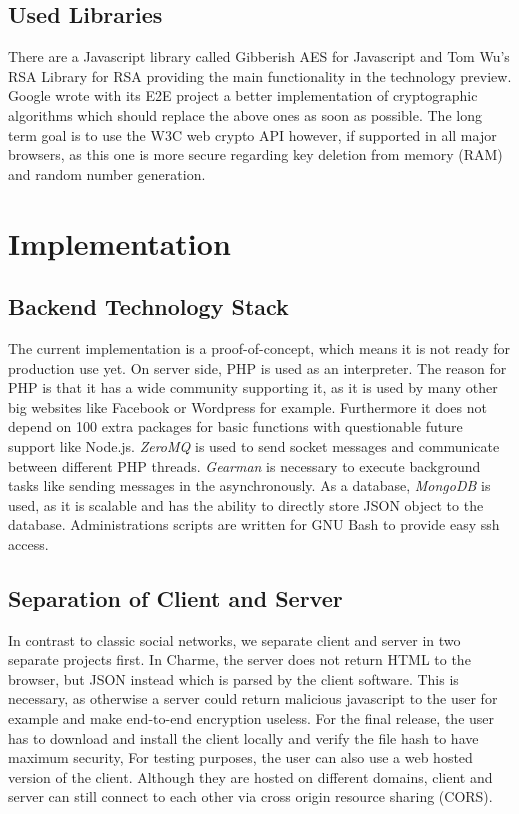 \documentclass{scrartcl}
\begin{document}
\subsection{Used Libraries}
There are a Javascript library called Gibberish AES for Javascript and Tom Wu's RSA Library for RSA providing the main functionality in the technology preview. Google wrote with its E2E project a better implementation of cryptographic algorithms which should replace the above ones as soon as possible. The long term goal is to use the W3C web crypto API however, if supported in all major browsers, as this one is more secure regarding key deletion from memory (RAM) and random number generation. 

\newpage
\section{Implementation}
\subsection{Backend Technology Stack}
The current implementation is a proof-of-concept, which means it is not ready for production use yet.
On server side, PHP is used as an interpreter. The reason for PHP is that it has a wide community supporting it, as it is used by many other big websites like Facebook or Wordpress for example. Furthermore it does not depend on 100 extra packages for basic functions with questionable future support like Node.js.
 \textit{ZeroMQ} is used to send socket messages and communicate between different PHP threads. \textit{Gearman} is necessary to execute background tasks like sending messages in the asynchronously. As a database, \textit{MongoDB} is used, as it is scalable and has the ability to directly store JSON object to the database.
Administrations scripts are written for GNU Bash to provide easy ssh access.



 \subsection{Separation of Client and Server}
In contrast to classic social networks, we separate client and server in two separate projects first. In Charme, the server does not return HTML to the browser, but JSON instead which is parsed by the client software. This is necessary, as otherwise a server could return malicious javascript to the user for example and make end-to-end encryption useless. For the final release, the user has to download and install the client locally and verify the file hash to have maximum security, For testing purposes, the user can also use a web hosted version of the client. Although they are hosted on different domains, client and server can still connect to each other via cross origin resource sharing (CORS).
\end{document}
